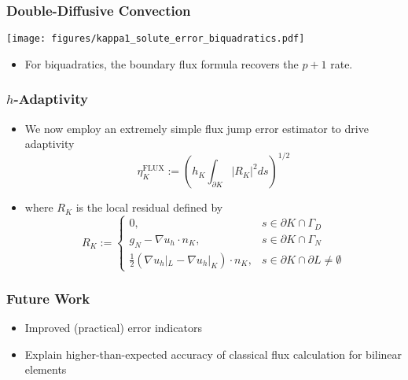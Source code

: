 \documentclass[
  compress
  ,12pt
]{beamer}
\begin{document}
\begin{frame}
  \frametitle{Double-Diffusive Convection}\vspace{-.25in}
    \begin{center}
	\texttt{[image: figures/kappa1\_solute\_error\_biquadratics.pdf]}    
  \end{center}
\vspace{-.2in}
    \begin{itemize}
      \item{For biquadratics, the boundary flux formula recovers the $p+1$ rate.}
    \end{itemize}
\end{frame}





\begin{frame}
  \frametitle{$h$-Adaptivity}
  \begin{itemize}
    \item{We now employ an extremely simple flux jump error estimator to drive adaptivity
  \begin{equation}
    \nonumber
    \eta^{\text{FLUX}}_K := \left( {h_K} \int_{\partial K} |R_K|^2 ds \right)^{1/2}
    \label{eqn:flux_indicator}
  \end{equation}
  }

    \item{
where $R_K$ is the local residual defined by
\begin{equation}
  \nonumber
  R_K := \left\{
    \begin{array}{cl}
      0, & s \in \partial K \cap \Gamma_D \\
      g_N - \nabla u_h \cdot n_K, & s \in \partial K \cap \Gamma_N \\
      \frac{1}{2}(\nabla u_h|_L - \nabla u_h|_K) \cdot n_K, & s \in \partial K \cap \partial L \neq \emptyset
    \end{array}
    \right.
  \label{eqn:residual}
\end{equation}
}
  \end{itemize}
\end{frame}




\begin{frame}
  \frametitle{Future Work}
  \begin{itemize}
    \item{Improved (practical) error indicators}
    \item{Explain higher-than-expected accuracy of classical
      flux calculation for bilinear elements} 
  \end{itemize}
\end{frame}


 
\end{document}
